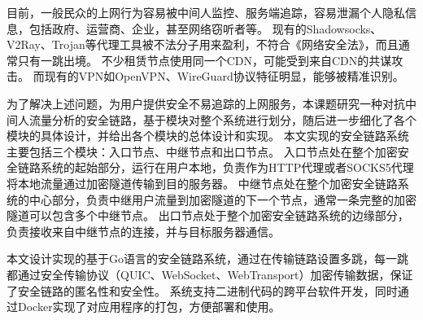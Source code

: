 

\begin{cabstract}
目前，一般民众的上网行为容易被中间人监控、服务端追踪，容易泄漏个人隐私信息，包括政府、运营商、企业，甚至网络窃听者等。
现有的Shadowsocks、V2Ray、Trojan等代理工具被不法分子用来盈利，不符合《网络安全法》，而且通常只有一跳出境。
不少租赁节点使用同一个CDN，可能受到来自CDN的共谋攻击。
而现有的VPN如OpenVPN、WireGuard协议特征明显，能够被精准识别。

为了解决上述问题，为用户提供安全不易追踪的上网服务，本课题研究一种对抗中间人流量分析的安全链路，基于模块对整个系统进行划分，随后进一步细化了各个模块的具体设计，并给出各个模块的总体设计和实现。
本文实现的安全链路系统主要包括三个模块：入口节点、中继节点和出口节点。
入口节点处在整个加密安全链路系统的起始部分，运行在用户本地，负责作为HTTP代理或者SOCKS5代理将本地流量通过加密隧道传输到目的服务器。
中继节点处在整个加密安全链路系统的中心部分，负责中继用户流量到加密隧道的下一个节点，通常一条完整的加密隧道可以包含多个中继节点。
出口节点处于整个加密安全链路系统的边缘部分，负责接收来自中继节点的连接，并与目标服务器通信。

本文设计实现的基于Go语言的安全链路系统，通过在传输链路设置多跳，每一跳都通过安全传输协议（QUIC、WebSocket、WebTransport）加密传输数据，保证了安全链路的匿名性和安全性。
系统支持二进制代码的跨平台软件开发，同时通过Docker实现了对应用程序的打包，方便部署和使用。  
\end{cabstract}

